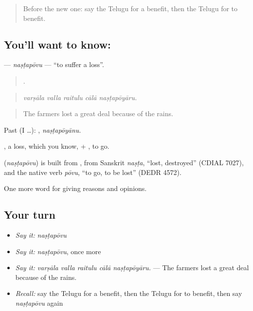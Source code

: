 \label{lesson:TE-C393-nastapovu}



\begin{quote}
Before the new one: say the Telugu for a benefit, then the Telugu for to benefit.
\end{quote}

\subsection*{You'll want to know: }
\textbf{} — \emph{naṣṭapōvu} — \textquotedblleft{}to suffer a loss\textquotedblright{}.

\begin{quote}
    .
\end{quote}

\begin{quote}
\emph{varṣāla valla raitulu cālā naṣṭapōyāru.}
\end{quote}

\begin{quote}
The farmers lost a great deal because of the rains.
\end{quote}

Past (I …): , \emph{naṣṭapōyānu}.

, a loss, which you know, + , to go.

\begin{cousinweb}
\textbf{} (\emph{naṣṭapōvu}) is built from , from Sanskrit \emph{naṣṭa}, \textquotedblleft{}lost, destroyed\textquotedblright{} (CDIAL 7027), and the native verb \emph{pōvu}, \textquotedblleft{}to go, to be lost\textquotedblright{} (DEDR 4572).
\end{cousinweb}

\begin{grammarlens}[title={What you've built}]
One more word for giving reasons and opinions.
\end{grammarlens}

\subsection*{Your turn}
\begin{itemize}
\raggedright
  \item \emph{Say it:} \emph{naṣṭapōvu}
  \item \emph{Say it:} \emph{naṣṭapōvu}, once more
  \item \emph{Say it:} \emph{varṣāla valla raitulu cālā naṣṭapōyāru.} — The farmers lost a great deal because of the rains.
  \item \emph{Recall:} say the Telugu for a benefit, then the Telugu for to benefit, then say \emph{naṣṭapōvu} again
\end{itemize}

